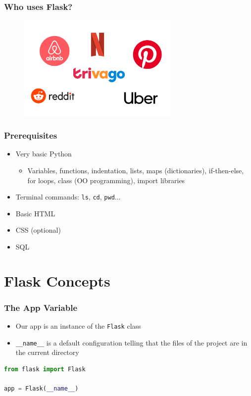 \documentclass[fleqn,aspectratio=169,10pt]{beamer}
\begin{document}
\begin{frame}[fragile]
  \frametitle{Who uses Flask?}
          \pause
  \begin{figure}[]
    \centering
    \includegraphics[width=0.7\textwidth]{companies}
  \end{figure}
\end{frame}

\begin{frame}
  \frametitle{Prerequisites}
  \begin{itemize}
          \pause
    \item Very basic Python
          \begin{itemize}
            \item Variables, functions, indentation, lists, maps (dictionaries), if-then-else, for loops, class (OO programming), import libraries
          \end{itemize}
    \item Terminal commands: \texttt{ls}, \texttt{cd}, \texttt{pwd}...
    \item Basic HTML
    \item CSS (optional)
    \item SQL
  \end{itemize}
\end{frame}

\section{Flask Concepts}

\begin{frame}[fragile]
  \frametitle{The App Variable}
  \begin{itemize}
    \item Our app is an instance of the \texttt{Flask} class
    \item \texttt{\_\_name\_\_} is a default configuration telling that the files of the project are in the current directory
  \end{itemize}
\begin{lstlisting}[language=Python]
from flask import Flask

app = Flask(__name__)
\end{lstlisting}
\end{frame}
\end{document}
